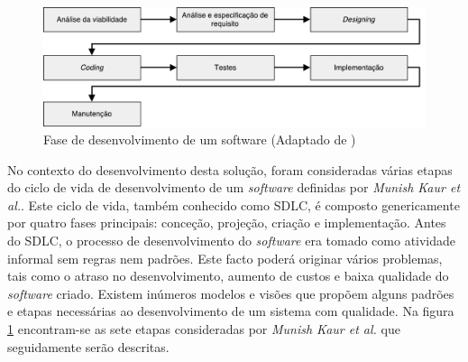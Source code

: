 \begin{figure}[!htb]
	\centering
	\includegraphics[scale=0.6]{esquemas/desenvolvimentoSW.pdf}
	\caption[Fases de desenvolvimento de um \textit{software} ]{Fase de desenvolvimento de um software (Adaptado de \cite{Saini2014})}
	\label{sdlcartic}
\end{figure}


No contexto do desenvolvimento desta solução, foram consideradas várias etapas do ciclo de vida de desenvolvimento de um \textit{software} definidas por  \textit{Munish Kaur et al.}\cite{Saini2014}. Este ciclo de vida, também conhecido como \ac{SDLC}, é composto genericamente por quatro fases principais: conceção, projeção, criação e implementação. Antes do \ac{SDLC}, o processo de desenvolvimento do \textit{software} era tomado como atividade informal sem regras nem padrões. Este facto poderá originar vários problemas, tais como o atraso no desenvolvimento, aumento de custos e baixa qualidade do \textit{software} criado. Existem inúmeros modelos e visões que propõem alguns padrões e etapas necessárias ao desenvolvimento de um sistema com qualidade. Na figura \ref{sdlcartic} encontram-se as sete etapas consideradas por \textit{Munish Kaur et al.}\cite{Saini2014} que seguidamente serão descritas. 










